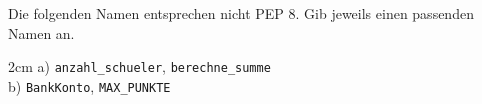 \question[2]
Die folgenden Namen entsprechen nicht PEP 8. Gib jeweils einen passenden Namen an.
\begin{solutionbox}{2cm}
a) \texttt{anzahl\_schueler}, \texttt{berechne\_summe} \\
b) \texttt{BankKonto}, \texttt{MAX\_PUNKTE}
\end{solutionbox}

